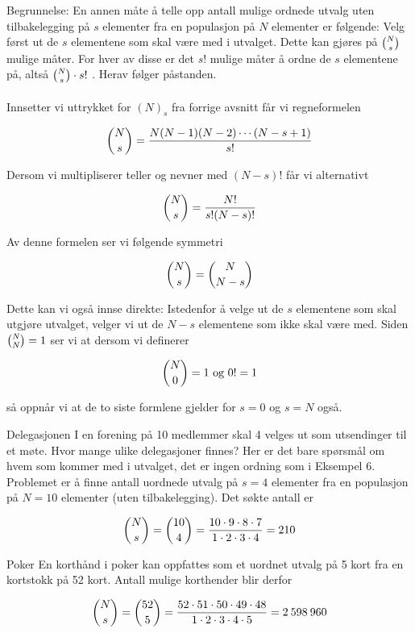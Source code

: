 \noindent Begrunnelse: En annen måte å telle opp antall mulige ordnede
utvalg uten tilbakelegging på $s$ elementer fra en populasjon på
$N$ elementer er følgende: Velg først ut de $s$ elementene som
skal være med i utvalget. Dette kan gjøres på ${{N}\choose{s}}$ mulige
måter. For hver av disse er det $s$! mulige måter å ordne de $s$
elementene på, altså ${{N}\choose{s}} \cdot s!$ . Herav følger
 påstanden. \\ \\

Innsetter vi uttrykket for $(N)_s$ fra forrige avsnitt får vi
regneformelen

\[ {{N}\choose{s}}=\frac{N(N-1)(N-2) \cdots(N-s+1)}{s!} \]

\noindent Dersom vi multipliserer teller og nevner med $(N-s)$! får vi
alternativt

\[ {{N}\choose{s}}=\frac{N!}{s!(N-s)!} \]

\noindent Av denne formelen ser vi følgende symmetri

\[ {{N}\choose{s}}={{N}\choose{N-s}} \]

\noindent Dette kan vi også innse direkte: Istedenfor å velge ut de $s$
elementene som skal utgjøre utvalget, velger vi ut de $N-s$
elementene som ikke skal være med.
Siden   ${{N}\choose{N}}=1$   ser vi at dersom vi definerer

\[     {{N}\choose{0}}=1 \mbox{     og      } 0!=1 \]

\noindent så oppnår vi at de to siste formlene gjelder for $s=0$ og
 $s=N$ også.\\


\begin{eksempel}{Delegasjonen}
I en forening på 10 medlemmer skal 4 velges ut som utsendinger
til et møte. Hvor mange ulike delegasjoner finnes? Her er det
bare spørsmål om hvem som kommer med i utvalget, det er ingen
ordning som i Eksempel 6. Problemet er å finne antall uordnede
utvalg på $s=4$ elementer fra en populasjon på $N=10$ elementer
(uten tilbakelegging). Det søkte antall er

\[ {{N}\choose{s}}={{10}\choose{4}}=\frac{10 \cdot 9 \cdot 8 \cdot 7}
                                        {1 \cdot 2 \cdot 3 \cdot 4}=210 \]
\end{eksempel}

\begin{eksempel}{Poker}
En korthånd i poker kan oppfattes som et uordnet utvalg på 5 kort
fra en kortstokk på 52 kort. Antall mulige korthender blir derfor

\[ {{N}\choose{s}}={{52}\choose{5}}=\frac{52 \cdot 51 \cdot 50 \cdot 49 \cdot 48}
                            {1 \cdot 2 \cdot 3 \cdot 4 \cdot 5}= 2\:598\:960 \]
\end{eksempel}

